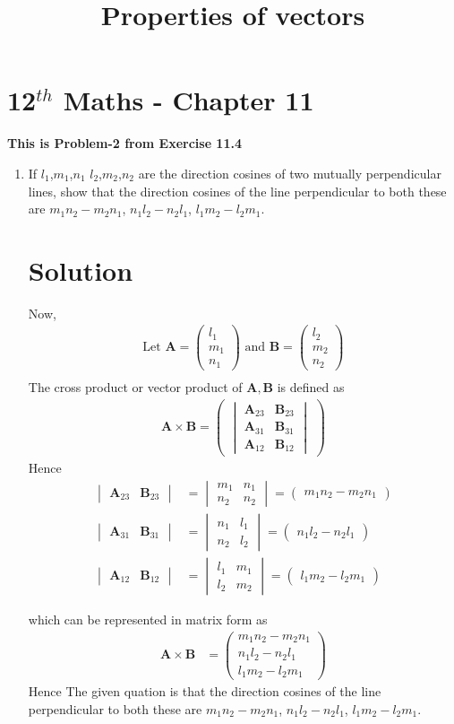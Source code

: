 \documentclass[12pt]{article}
\newcommand{\mydet}[1]{\ensuremath{\begin{vmatrix}#1\end{vmatrix}}}
\newcommand{\myvec}[1]{\ensuremath{\begin{pmatrix}#1\end{pmatrix}}}
\let\vec\mathbf
\begin{document}
\begin{center}
\title{\textbf{Properties of vectors}}
\date{\vspace{-5ex}} %
\maketitle
\end{center}
\setcounter{page}{1}
\section{12$^{th}$ Maths - Chapter 11}
\textbf{This is Problem-2 from Exercise 11.4}

\begin{enumerate}
\item If $l_1$,$m_1$,$n_1$  $l_2$,$m_2$,$n_2$ are the direction cosines of two mutually perpendicular lines, show that the direction cosines of the line perpendicular to both these are  $m_1n_2-m_2n_1$, $n_1l_2-n_2l_1$, $l_1m_2-l_2m_1$.

\section{Solution}
Now,
\begin{align}
\text{Let } \vec{A} = \myvec{l_1\\m_1\\n_1} \text{ and } \vec{B} = \myvec{l_2\\ m_2 \\ n_2}\\
\end{align}
The cross product or vector product of $\vec{A},\vec{B}$ is defined as
\begin{align}
	\vec{A} \times \vec{B} = \myvec{\mydet{\vec{A}_{23}&\vec{B}_{23}\\\vec{A}_{31}&\vec{B}_{31}\\\vec{A}_{12}&\vec{B}_{12}}}
\end{align}
Hence
\begin{align}
	\mydet{\vec{A}_{23}&\vec{B}_{23}}&=\mydet{m_1&n_1\\n_2&n_2}=\myvec{m_1n_2-m_2n_1}\\
	\mydet{\vec{A}_{31}&\vec{B}_{31}}&=\mydet{n_1&l_1\\n_2&l_2}=\myvec{n_1l_2-n_2l_1}\\
	\mydet{\vec{A}_{12}&\vec{B}_{12}}&=\mydet{l_1&m_1\\l_2&m_2}=\myvec{l_1m_2-l_2m_1}
\end{align}

which can be represented in matrix form as
\begin{align}
	\vec{A} \times \vec{B}&=\myvec{m_1n_2-m_2n_1\\n_1l_2-n_2l_1\\l_1m_2-l_2m_1}
\end{align}
Hence
The given quation is that the direction cosines of the line perpendicular to both these are  $m_1n_2-m_2n_1$, $n_1l_2-n_2l_1$, $l_1m_2-l_2m_1$.


\end{enumerate}
\end{document}
